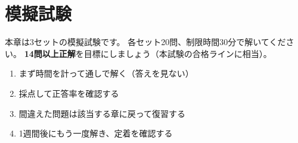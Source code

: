 \chapter{模擬試験}


本章は3セットの模擬試験です。
各セット20問、制限時間30分で解いてください。
\textbf{14問以上正解}を目標にしましょう（本試験の合格ラインに相当）。

\begin{advice}[模擬試験の使い方]
\begin{enumerate}
  \item まず時間を計って通しで解く（答えを見ない）
  \item 採点して正答率を確認する
  \item 間違えた問題は該当する章に戻って復習する
  \item 1週間後にもう一度解き、定着を確認する
\end{enumerate}
\end{advice}


